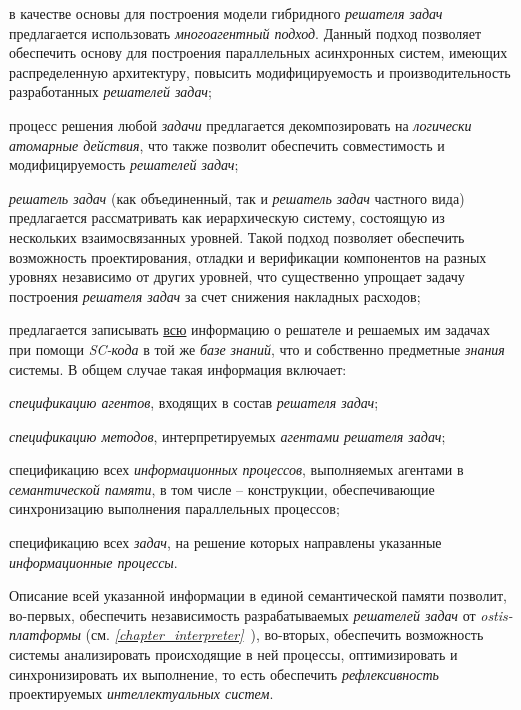 \begin{textitemize}
\item в качестве основы для построения модели гибридного \textit{решателя задач} предлагается использовать \textit{многоагентный подход}. Данный подход позволяет обеспечить основу для построения параллельных асинхронных систем, имеющих распределенную архитектуру, повысить модифицируемость и производительность разработанных \textit{решателей задач};
\item процесс решения любой \textit{задачи} предлагается декомпозировать на \textit{логически атомарные действия}, что также позволит обеспечить совместимость и модифицируемость \textit{решателей задач};
\item \textit{решатель задач} (как объединенный, так и \textit{решатель задач} частного вида) предлагается рассматривать как иерархическую систему, состоящую из нескольких взаимосвязанных уровней. Такой подход позволяет обеспечить возможность проектирования, отладки и верификации компонентов на разных уровнях независимо от других уровней, что существенно упрощает задачу построения \textit{решателя задач} за счет снижения накладных расходов;
\item предлагается записывать \underline{всю} информацию о решателе и решаемых им задачах при помощи \textit{SC-кода} в той же \textit{базе знаний}, что и собственно предметные \textit{знания} системы. В общем случае такая информация включает: 

	\begin{textitemize}
	\item \textit{спецификацию агентов}, входящих в состав \textit{решателя задач}; 
	\item \textit{спецификацию методов}, интерпретируемых \textit{агентами} \textit{решателя задач}; 
	\item спецификацию всех \textit{информационных процессов}, выполняемых агентами в \textit{семантической памяти}, в том числе -- конструкции, обеспечивающие синхронизацию выполнения параллельных процессов;
	\item спецификацию всех \textit{задач}, на решение которых направлены указанные \textit{информационные процессы}. 
	\end{textitemize}

Описание всей указанной информации в единой семантической  памяти позволит, во-первых, обеспечить независимость разрабатываемых \textit{решателей задач} от \textit{ostis-платформы} (см. \textit{\ref{chapter_interpreter}~}), во-вторых, обеспечить возможность системы анализировать происходящие в ней процессы, оптимизировать и синхронизировать их выполнение, то есть обеспечить \textit{рефлексивность} проектируемых \textit{интеллектуальных систем}.
\end{textitemize}

